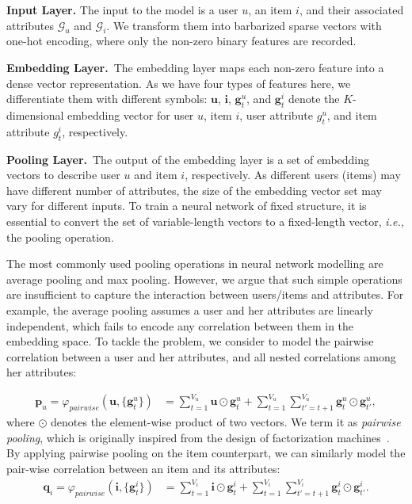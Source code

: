 \documentclass[sigconf]{acmart}
\newcommand{\Mat}[1]{\mathbf{#1}}
\newcommand{\Set}[1]{\mathcal{#1}}
\newcommand{\ie}{\emph{i.e., }}
\begin{document}
\textbf{Input Layer.} The input to the model is a user $u$, an item $i$, and their associated attributes $\Set{G}_{u}$ and $\Set{G}_{i}$. We transform them into barbarized sparse vectors with one-hot encoding, where only the non-zero binary features are recorded.


\textbf{Embedding Layer.}~The embedding layer maps each non-zero feature into a dense vector representation. As we have four types of features here, we differentiate them with different symbols: $\Mat{u}$, $\Mat{i}$, $\Mat{g}^u_t$, and $\Mat{g}^i_t$ denote the $K$-dimensional embedding vector for user $u$, item $i$, user attribute $g^u_t$, and item attribute $g^i_t$, respectively.

\textbf{Pooling Layer.}~The output of the embedding layer is a set of embedding vectors to describe user $u$ and item $i$, respectively. As different users (items) may have different number of attributes, the size of the embedding vector set may vary for different inputs. To train a neural network of fixed structure, it is essential to convert the set of variable-length vectors to a fixed-length vector, \ie the pooling operation.

The most commonly used pooling operations in neural network modelling are average pooling and max pooling. However, we argue that such simple operations are insufficient to capture the interaction between users/items and attributes.
For example, the average pooling assumes a user and her attributes are linearly independent, which fails to encode any correlation between them in the embedding space.
To tackle the problem, we consider to model the pairwise correlation between a user and her attributes, and all nested correlations among her attributes:


\begin{align}\label{equ:user-bilinear-pooling}
\Mat{p}_{u}=\varphi_{pairwise}(\Mat{u},\{\Mat{g}^u_t\})&=\sum_{t=1}^{V_{u}}\Mat{u}\odot\Mat{g}^{u}_{t}+\sum_{t=1}^{V_{u}}\sum_{t'=t+1}^{V_{u}}\Mat{g}^{u}_{t}\odot\Mat{g}^{u}_{t'},
\end{align}
where $\odot$ denotes the element-wise product of two vectors. We term it as \emph{pairwise pooling}, which is originally inspired from the design of factorization machines~\cite{DBLP:conf/icdm/Rendle10,he2017neural}. By applying pairwise pooling on the item counterpart, we can similarly model the pair-wise correlation between an item and its attributes:
\begin{align}\label{equ:item-bilinear-pooling}
\Mat{q}_{i}=\varphi_{pairwise}(\Mat{i},\{\Mat{g}^i_t\})&=\sum_{t=1}^{V_{i}}\Mat{i}\odot\Mat{g}^{i}_{t}+\sum_{t=1}^{V_{i}}\sum_{t'=t+1}^{V_{i}}\Mat{g}^{i}_{t}\odot\Mat{g}^{i}_{t'}.
\end{align}
\end{document}
